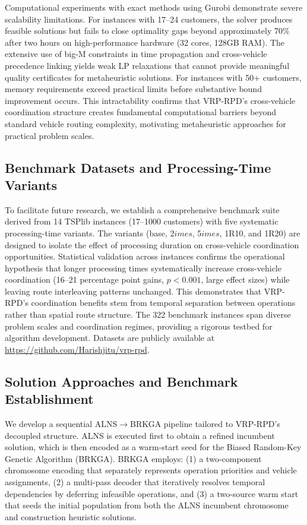 \documentclass{article}
\begin{document}
Computational experiments with exact methods using Gurobi demonstrate severe scalability limitations. For instances with 17--24 customers, the solver produces feasible solutions but fails to close optimality gaps beyond approximately 70\% after two hours on high-performance hardware (32 cores, 128GB RAM). The extensive use of big-M constraints in time propagation and cross-vehicle precedence linking yields weak LP relaxations that cannot provide meaningful quality certificates for metaheuristic solutions. For instances with 50+ customers, memory requirements exceed practical limits before substantive bound improvement occurs. This intractability confirms that VRP-RPD's cross-vehicle coordination structure creates fundamental computational barriers beyond standard vehicle routing complexity, motivating metaheuristic approaches for practical problem scales.

\subsection{Benchmark Datasets and Processing-Time Variants}

To facilitate future research, we establish a comprehensive benchmark suite derived from 14 TSPlib instances (17--1000 customers) with five systematic processing-time variants. The variants (base, 2$	imes$, 5$	imes$, 1R10, and 1R20) are designed to isolate the effect of processing duration on cross-vehicle coordination opportunities. Statistical validation across instances confirms the operational hypothesis that longer processing times systematically increase cross-vehicle coordination (16--21 percentage point gains, $p < 0.001$, large effect sizes) while leaving route interleaving patterns unchanged. This demonstrates that VRP-RPD's coordination benefits stem from temporal separation between operations rather than spatial route structure. The 322 benchmark instances span diverse problem scales and coordination regimes, providing a rigorous testbed for algorithm development. Datasets are publicly available at \url{https://github.com/Harishjitu/vrp-rpd}.

\subsection{Solution Approaches and Benchmark Establishment}

We develop a sequential ALNS$\to$BRKGA pipeline tailored to VRP-RPD's decoupled structure. ALNS is executed first to obtain a refined incumbent solution, which is then encoded as a warm-start seed for the Biased Random-Key Genetic Algorithm (BRKGA). BRKGA employs: (1) a two-component chromosome encoding that separately represents operation priorities and vehicle assignments, (2) a multi-pass decoder that iteratively resolves temporal dependencies by deferring infeasible operations, and (3) a two-source warm start that seeds the initial population from both the ALNS incumbent chromosome and construction heuristic solutions.
\end{document}
